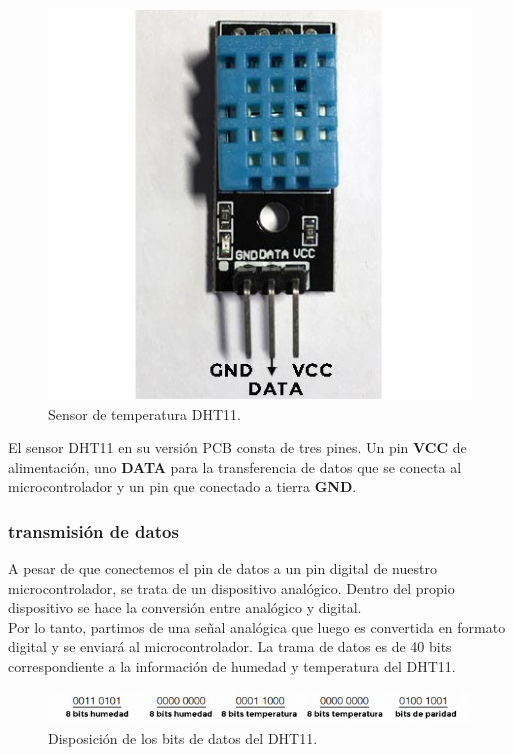 \begin{figure}[H]
  \begin{center}
    \includegraphics[scale=0.3]{imagenes/dth11.jpg}
  \end{center}
  \caption{Sensor de temperatura DHT11.}
  \label{figura:sensor_dth11}
\end{figure}

El sensor DHT11 en su versión PCB consta de tres pines. Un pin \textbf{VCC} de alimentación, uno \textbf{DATA} para la transferencia de
datos que se conecta al microcontrolador y un pin que conectado a tierra \textbf{GND}.\\

\subsubsection{transmisión de datos}

A pesar de que conectemos el pin de datos a un pin digital de nuestro microcontrolador, se trata de un dispositivo analógico. Dentro del propio dispositivo se hace la
conversión entre analógico y digital.\\

Por lo tanto, partimos de una señal analógica que luego es convertida en formato digital y se enviará al microcontrolador. La trama de datos es de 40 bits correspondiente a la
información de humedad y temperatura del DHT11.\\

\begin{figure}[H]
  \begin{center}
    \includegraphics[scale=0.6]{imagenes/dth11_bits.jpg}
  \end{center}
  \caption{Disposición de los bits de datos del DHT11.}
  \label{figura:sensor_dth11_bits}
\end{figure}

